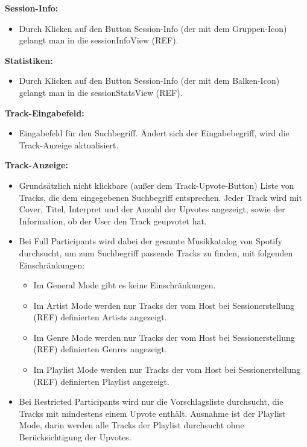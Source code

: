 \documentclass[oneside, ngerman]{sdqtechreport}
\begin{document}
\textbf{Session-Info:}
\begin{itemize}
    \item Durch Klicken auf den Button Session-Info (der mit dem Gruppen-Icon) gelangt man in die sessionInfoView (REF).
\end{itemize}

\textbf{Statistiken:}
\begin{itemize}
    \item Durch Klicken auf den Button Session-Info (der mit dem Balken-Icon) gelangt man in die sessionStatsView (REF).
\end{itemize}

\textbf{Track-Eingabefeld:}
\begin{itemize}
    \item Eingabefeld für den Suchbegriff. Ändert sich der Eingabebegriff, wird die Track-Anzeige aktualisiert.
\end{itemize}

\textbf{Track-Anzeige:}
\begin{itemize}
    \item Grundsätzlich nicht klickbare (außer dem Track-Upvote-Button) Liste von Tracks, die dem eingegebenen Suchbegriff entsprechen. Jeder Track wird mit Cover, Titel, Interpret und der Anzahl der Upvotes angezeigt, sowie der Information, ob der User den Track geupvotet hat.
    \item Bei Full Participants wird dabei der gesamte Musikkatalog von Spotify durchsucht, um zum Suchbegriff passende Tracks zu finden, mit folgenden Einschränkungen:
    \begin{itemize}
        \item Im General Mode gibt es keine Einschränkungen.
        \item Im Artist Mode werden nur Tracks der vom Host bei Sessionerstellung (REF) definierten Artists angezeigt.
        \item Im Genre Mode werden nur Tracks der vom Host bei Sessionerstellung (REF) definierten Genres angezeigt.
        \item Im Playlist Mode werden nur Tracks der vom Host bei Sessionerstellung (REF) definierten Playlist angezeigt.
    \end{itemize}
    \item Bei Restricted Participants wird nur die Vorschlagsliste durchsucht, die Tracks mit mindestens einem Upvote enthält. Ausnahme ist der Playlist Mode, darin werden alle Tracks der Playlist durchsucht ohne Berücksichtigung der Upvotes.
\end{itemize}
\end{document}

